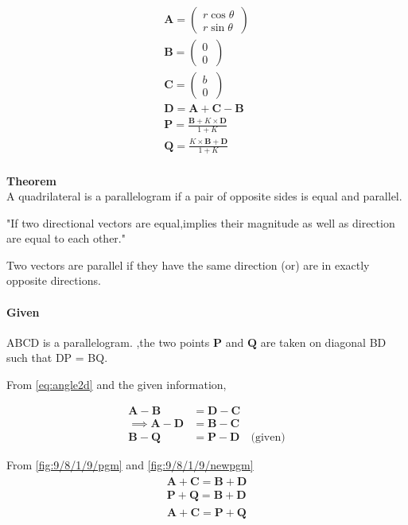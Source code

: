 \documentclass[10pt, a4paper]{article}
\let\vec\mathbf
\begin{document}
\begin{align*}
\vec{A}=\begin{pmatrix} r\cos\theta\\ r\sin\theta\ \end{pmatrix} \\
\vec{B}=\begin{pmatrix} 0\\ 0\ \end{pmatrix} \\
\vec{C}=\begin{pmatrix} b\\ 0\ \end{pmatrix} \\
\vec{D}={\vec{A}+\vec{C}-\vec{B}} \\
\vec{P} =  \frac{\vec{B} +K\times \vec{D}}{1+K} \\
\vec{Q} =  \frac{K\times\vec{B} +\vec{D}}{1+K} \\ 
\end{align*}


\textbf{Theorem}\\
A quadrilateral is a parallelogram if a pair of opposite sides
is equal and parallel.

"If two directional vectors are equal,implies their magnitude as well as direction are equal to each other."

Two vectors are parallel if they have the same direction (or) are in exactly opposite directions.

\paragraph{Given} ABCD is a parallelogram.
 ,the two points $\vec{P}$ and $\vec{Q}$ are taken on diagonal BD such that DP = BQ.

\fi
From 
    \eqref{eq:angle2d} and the given information,

\begin{align}
		\label{fig:9/8/1/9/pgm}
	\vec{A}-\vec{B} &=\vec{D}-\vec{C} \\
	\implies    \vec{A}-\vec{D} &=\vec{B}-\vec{C}\\
	\vec{B}-\vec{Q} &=\vec{P}-\vec{D} \quad \text{(given)}
		\label{fig:9/8/1/9/newpgm}
\end{align}

From 
		\eqref{fig:9/8/1/9/pgm}
		and
		\eqref{fig:9/8/1/9/newpgm}
		\iffalse
\begin{align}
\begin{split}
    \vec{A}+\vec{C} =\vec{B}+\vec{D}\\
    \vec{P}+\vec{Q} =\vec{B}+\vec{D}
\end{split}
\end{align}
\begin{align}
    \vec{A}+\vec{C} =\vec{P}+\vec{Q}
\end{align}
\end{document}
